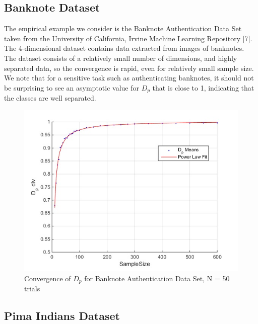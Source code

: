 \documentclass{article}
\begin{document}
	
	\newpage


	\subsection{\small Banknote Dataset}
	\indent The empirical example we consider is the Banknote Authentication Data Set taken from the University of California, Irvine Machine Learning Repository [7]. The 4-dimensional dataset contains data extracted from images of banknotes. The dataset consists of a relatively small number of dimensions, and highly separated data, so the convergence is rapid, even for relatively small sample size. We note that for a sensitive task such as authenticating banknotes, it should not be surprising to see an asymptotic value for $D_p$ that is close to 1, indicating that the classes are well separated.  
	\begin{figure}[h!]
			\caption{Convergence of $D_p$ for Banknote Authentication Data Set, N = 50 trials}
			\centering
			\includegraphics[scale=0.6]{dp_n50_banknote}
	\end{figure}

	\subsection{\small Pima Indians Dataset}
	
\end{document}

